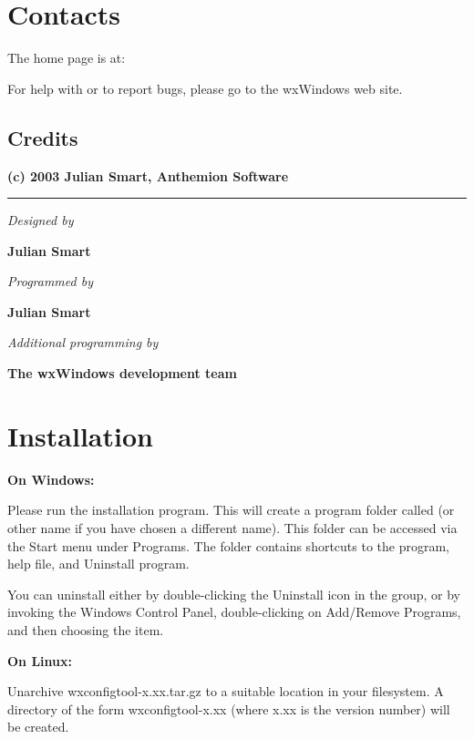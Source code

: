\chapter{Contacts}%
%
\setfooter{\thepage}{}{}{}{}{\thepage}%

The \ctname home page is at:

{\tt \cturl}

For help with \ctshortname or to report bugs,
please go to the wxWindows web site.

\section{Credits}

\begin{center}
{\bf (c) 2003 Julian Smart, Anthemion Software}\hrule

{\it Designed by}

{\bf Julian Smart}

{\it Programmed by}

{\bf Julian Smart}

{\it Additional programming by}

{\bf The wxWindows development team}

\end{center}

\chapter{Installation}%
%
\setfooter{\thepage}{}{}{}{}{\thepage}%

{\bf On Windows:}

Please run the installation program. This will create a program
folder called \ctname (or other name if you have chosen a different name). This
folder can be accessed via the Start menu under Programs. The
folder contains shortcuts to the program, help file, and Uninstall program.

You can uninstall \ctshortname either by double-clicking the Uninstall \ctshortname icon
in the \ctname group, or by invoking the Windows Control Panel,
double-clicking on Add/Remove Programs, and then choosing the \ctshortname item.

{\bf On Linux:}

Unarchive wxconfigtool-x.xx.tar.gz to a suitable location
in your filesystem. A directory of the form wxconfigtool-x.xx
(where x.xx is the version number) will be created.

